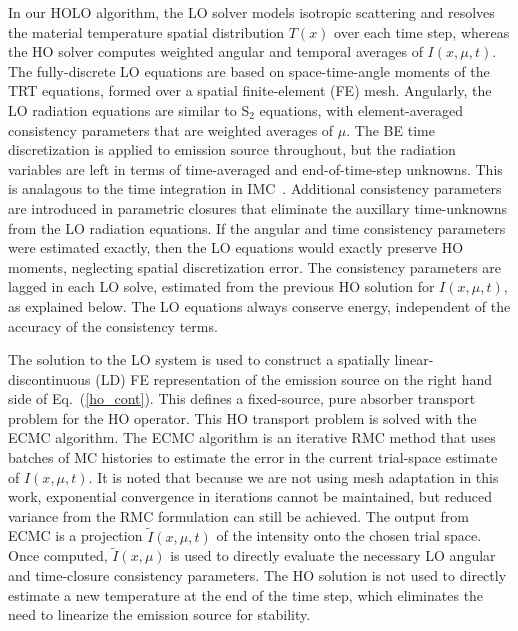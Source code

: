 \documentclass{anstrans}
\renewcommand{\eqref}[1]{(\ref{#1})}
\begin{document}
In our HOLO algorithm, the LO solver models isotropic scattering and
resolves the material temperature spatial distribution $T(x)$ over each time step, whereas
the HO solver computes weighted angular and temporal averages of $I(x,\mu,t)$.  The
fully-discrete LO equations are based on space-time-angle moments of the TRT equations, formed over a spatial finite-element (FE)
mesh.   Angularly, the LO
radiation equations are similar to S$_2$ equations,  with element-averaged
consistency parameters that are weighted averages of $\mu$. The BE time discretization is applied to emission source throughout, but the radiation
variables are left in terms of time-averaged and end-of-time-step unknowns.  This is analagous to
the time integration in IMC~\cite{fnc}.   Additional
consistency parameters are introduced in parametric closures that eliminate the auxillary
time-unknowns from the LO radiation equations.
If the angular and time
consistency parameters were estimated exactly, then the LO equations would exactly preserve HO moments,
neglecting spatial discretization error.  The consistency parameters are lagged
in each LO solve, estimated from the previous HO solution for $I(x,\mu,t)$,
as explained below.    The LO equations always conserve energy,
independent of the accuracy of the consistency terms.

The solution to the LO system is used to construct a spatially linear-discontinuous (LD) FE representation of
the emission source on the right hand side of Eq.~\eqref{ho_cont}.  This defines a fixed-source, pure absorber
transport problem for the HO operator. This HO transport problem is solved with the ECMC algorithm.  The ECMC
algorithm is an iterative RMC method that uses
batches of MC histories to estimate the error in the current trial-space estimate of 
$I(x,\mu,t)$.  It is noted that because we are not using
mesh adaptation in this work, exponential convergence in iterations cannot be maintained,
but reduced variance from the RMC formulation can still be achieved.  The output from ECMC is a projection $\tilde I(x,\mu,t)$ of the intensity onto
the chosen trial space. Once computed, $\tilde{I}(x,\mu)$ is used to directly evaluate the
necessary LO angular and time-closure consistency parameters.   The HO solution is not used to directly estimate a new temperature at
the end of the time step, which eliminates the need to linearize the emission source for
stability.
\end{document}
